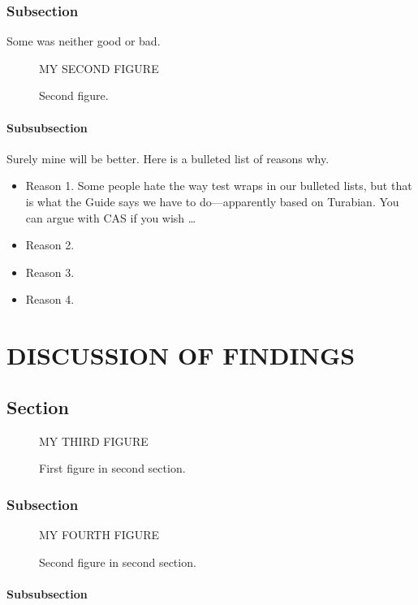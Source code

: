 \documentclass[10pt,econ,letterpaper]{authesis}
\begin{document}
\subsection{Subsection}

Some was neither good or bad.

\begin{figure}
\centering MY SECOND FIGURE
\caption{Second figure.}
\end{figure}


\subsubsection{Subsubsection}

Surely mine will be better.
Here is a bulleted list of reasons why.
\begin{itemize}
\item Reason 1.
Some people hate the way test wraps in our bulleted lists,
but that is what the Guide says we have to do---apparently based on Turabian.
You can argue with CAS if you wish \dots
\item Reason 2.
\item Reason 3.
\item Reason 4.
\end{itemize}


\chapter{DISCUSSION OF FINDINGS}


\section{Section}

\begin{figure}
\centering MY THIRD FIGURE
\caption{First figure in second section.}
\end{figure}



\subsection{Subsection}

\begin{figure}
\centering MY FOURTH FIGURE
\caption{Second figure in second section.}
\end{figure}


\subsubsection{Subsubsection}
\end{document}
